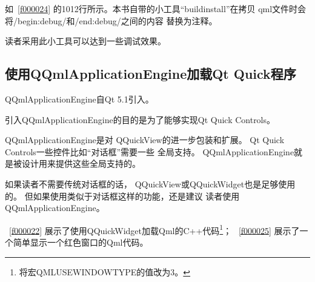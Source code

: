 如\lstlistingname\ \ref{f000024}
的10\raisebox{0.16ex}{\sourcefonttwo\~{}}12行所示。本书自带的小工具“build\underline{\hspace{0.5em}}install”在拷贝
qml文件时会将/\raisebox{-0.35ex}{\sourcefonttwo{}*}begin:debug\raisebox{-0.35ex}{\sourcefonttwo{}*}/和/\raisebox{-0.35ex}{\sourcefonttwo{}*}end:debug\raisebox{-0.35ex}{\sourcefonttwo{}*}/之间的内容
替换为注释。

读者采用此小工具可以达到一些调试效果。

\FloatBarrier
\subsection{
使用QQmlApplicationEngine加载Qt Quick程序
}\label{ss001210}


QQmlApplicationEngine自Qt 5.1引入。

引入QQmlApplicationEngine的目的是为了能够实现Qt Quick Controls。

QQmlApplicationEngine是对
QQuickView的进一步包装和扩展。
Qt Quick Controls一些控件比如“对话框”需要一些
全局支持。
QQmlApplicationEngine就是被设计用来提供这些全局支持的。

如果读者不需要传统对话框的话，
QQuickView或QQuickWidget也是足够使用的。
但如果使用类似于对话框这样的功能，还是建议
读者使用QQmlApplicationEngine。

\lstlistingname\ \ref{f000022}
展示了使用QQuickWidget加载Qml的C{\sourcefonttwo{}+}{\sourcefonttwo{}+}代码\footnote{
将宏QML\underline{\hspace{0.5em}}USE\underline{\hspace{0.5em}}WINDOW\underline{\hspace{0.5em}}TYPE的值改为3。
}；
\lstlistingname\ \ref{f000025}
展示了一个简单显示一个红色窗口的Qml代码。

